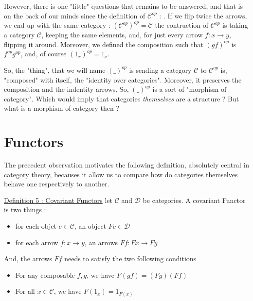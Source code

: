 \documentclass{article}
\begin{document}
{\newline
\noindent However, there is one "little" questions that remains to be answered, and that is on the back of our minds since the definition of $\mathcal{C}^{op}$ : \newline.
If we flip twice the arrows, we end up with the same category :  $(\mathcal{C}^{op})^{op} = \mathcal{C}$
the contruction of $\mathcal{C}^{op}$ is taking a category $\mathcal{C}$, keeping the same elements, and, for just every arrow $f : x \rightarrow y$, flipping it around. Moreover, we defined the composition such that $(gf)^{op}$ is $f^{op} g^{op}$, and, of course $(1_{x})^{op} = 1_{x}$.\newline

\newline \noindent  So, the "thing", that we will name $(\text{\_})^{op}$ is sending a category $\mathcal{C}$ to $\mathcal{C}^{op}$ is, "composed" with itself, the "identity over categories". Moreover, it preserves the composition and the indentity arrows. So, $(\text{\_})^{op}$ is a sort of "morphism of category". \newline
Which would imply that categories \textit{themselves} are a structure ? But what is a morphism of category then ?

\section {Functors}
The precedent observation motivates the following definition, absolutely central in category theory, becauses it allow us to compare how do categories themselves behave one respectively to another. \newline
\newline \newline \newpage

\noindent \large \underline{Definition 5 : Covariant Functors} \newline \normalsize \newline
let $\mathcal{C}$ and $\mathcal{D}$ be categories. \newline
A covariant Functor is two things : \begin{itemize}[noitemsep]
\item for each objet $c \in \mathcal{C}$, an object $Fc \in \mathcal{D}$ 
\item for each arrow $f : x \rightarrow y$, an arrows $Ff : Fx \rightarrow Fy$  \end{itemize}
And, the arrows $Ff$ needs to satisfy the two following conditions
\begin{itemize}[noitemsep]
\item For any composable $f, g$, we have $F(gf) = (Fg) (Ff)$
\item For all $x \in \mathcal{C}$, we have $F(1_{x}) = 1_{F(x)}$
\end{itemize}


}
\end{document}

